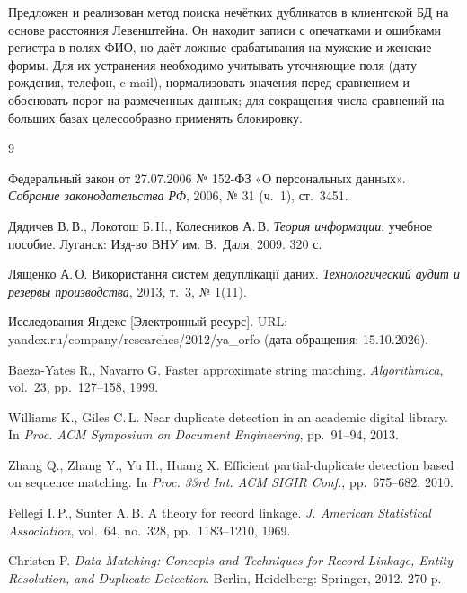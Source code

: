 \documentclass{misisarticle}
\begin{document}
Предложен и реализован метод поиска нечётких дубликатов в клиентской БД на основе расстояния Левенштейна. Он находит записи с опечатками и ошибками регистра в полях ФИО, но даёт ложные срабатывания на мужские и женские формы. Для их устранения необходимо учитывать уточняющие поля (дату рождения, телефон, e-mail), нормализовать значения перед сравнением и обосновать порог на размеченных данных; для сокращения числа сравнений на больших базах целесообразно применять блокировку.

\begin{thebibliography}{9}

 Федеральный закон от 27.07.2006 № 152-ФЗ «О персональных данных». \textit{Собрание законодательства РФ}, 2006, № 31 (ч.~1), ст.~3451.

 Дядичев В.\,В., Локотош Б.\,Н., Колесников А.\,В. \textit{Теория информации}: учебное пособие. Луганск: Изд-во ВНУ им. В.~Даля, 2009. 320 с.

 Лященко А.\,О. Використання систем дедуплікації даних. \textit{Технологический аудит и резервы производства}, 2013, т.~3, № 1(11).

 Исследования Яндекс [Электронный ресурс]. URL: yandex.ru/company/researches/2012/ya\_orfo (дата обращения: 15.10.2026).

 Baeza-Yates R., Navarro G. Faster approximate string matching. \textit{Algorithmica}, vol.~23, pp.~127--158, 1999.

 Williams K., Giles C.\,L. Near duplicate detection in an academic digital library. In \textit{Proc. ACM Symposium on Document Engineering}, pp.~91--94, 2013.

 Zhang Q., Zhang Y., Yu H., Huang X. Efficient partial-duplicate detection based on sequence matching. In \textit{Proc. 33rd Int. ACM SIGIR Conf.}, pp.~675--682, 2010.

 Fellegi I.\,P., Sunter A.\,B. A theory for record linkage. \textit{J. American Statistical Association}, vol.~64, no.~328, pp.~1183--1210, 1969.

 Christen P. \textit{Data Matching: Concepts and Techniques for Record Linkage, Entity Resolution, and Duplicate Detection}. Berlin, Heidelberg: Springer, 2012. 270 p.

\end{thebibliography}
\end{document}
